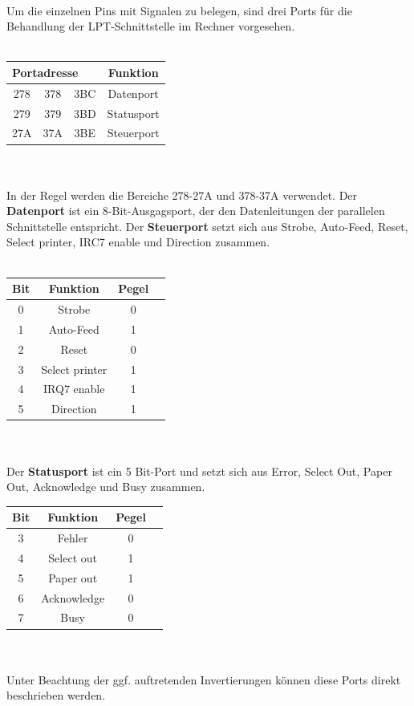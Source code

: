 \documentclass[a4paper,11pt]{article}
\begin{document}
\noindent \\
Um die einzelnen Pins mit Signalen zu belegen, sind drei Ports für die Behandlung der LPT-Schnittstelle im Rechner vorgesehen.  \\\\
 \begin{tabular}{|c|c|c|c|}
 \hline
\multicolumn{3}{|l|}{Portadresse}	&	Funktion\\  \hline 
278	&	378	&	3BC	&	Datenport \\  \hline 
279	&	379	&	3BD	&	Statusport \\  \hline 
27A	&	37A	&	3BE	&	Steuerport \\  \hline 
 \end{tabular} 
\noindent \\\\
In der Regel werden die Bereiche 278-27A und 378-37A verwendet. Der \textbf{Datenport} ist ein 8-Bit-Ausgagsport, der den Datenleitungen der parallelen Schnittstelle entspricht.  Der \textbf{Steuerport} setzt sich aus  Strobe, Auto-Feed, Reset, Select printer, IRC7 enable und Direction zusammen. 
\\ \\
 \begin{tabular}{|c|c|c|c|}
  \hline
Bit	&	Funktion	&	Pegel  \\ \hline
0	&	Strobe		&	0 \\ \hline
1	&	Auto-Feed	&	1\\ \hline
2	&	Reset		&	0\\ \hline
3	&	Select printer	&	1\\ \hline
4	&	IRQ7 enable	&	1\\ \hline
5	&	Direction	&	1\\ \hline
 \end{tabular} 
\noindent \\\\
Der \textbf{Statusport} ist ein 5 Bit-Port und setzt sich aus Error, Select Out, Paper Out, Acknowledge und Busy zusammen. \\

\noindent
\begin{tabular}{|c|c|c|c|}
  \hline
Bit	&	Funktion	&	Pegel\\ \hline
3	&	Fehler		&	0 	\\ \hline
4	&	Select out	&	1 \\ \hline
5	&	Paper out	&	1 \\ \hline
6	&	Acknowledge	&	0 \\ \hline
7	&	Busy		&	0 \\ \hline
 \end{tabular} 
\noindent \\\\
Unter Beachtung der ggf. auftretenden Invertierungen können diese Ports direkt beschrieben werden.\\\\
\end{document}
